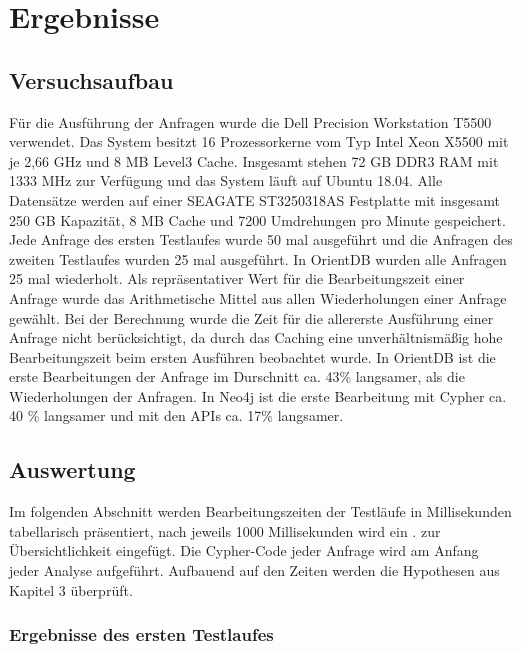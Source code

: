 
\chapter{Ergebnisse} %

\label{Kaptiel4} %

\section{Versuchsaufbau}
Für die Ausführung der Anfragen wurde die Dell Precision Workstation T5500 verwendet. Das System besitzt 16 Prozessorkerne vom Typ Intel Xeon  X5500 mit je 2,66 GHz und  8 MB Level3 Cache. Insgesamt stehen 72 GB DDR3 RAM mit 1333 MHz zur Verfügung und das System läuft auf Ubuntu 18.04. Alle Datensätze werden auf einer SEAGATE ST3250318AS Festplatte mit insgesamt 250 GB Kapazität, 8 MB Cache und 7200 Umdrehungen pro Minute gespeichert.\newline
 Jede Anfrage des ersten Testlaufes wurde 50 mal ausgeführt und die Anfragen des zweiten Testlaufes wurden 25 mal ausgeführt. In OrientDB wurden alle Anfragen 25 mal wiederholt. Als repräsentativer Wert für die Bearbeitungszeit einer Anfrage  wurde das Arithmetische Mittel aus allen Wiederholungen einer Anfrage gewählt. Bei der Berechnung wurde die Zeit für die allererste Ausführung einer Anfrage nicht berücksichtigt, da durch das Caching eine unverhältnismäßig hohe Bearbeitungszeit beim ersten Ausführen beobachtet wurde. In OrientDB ist die erste Bearbeitungen der Anfrage im Durschnitt ca. 43\% langsamer, als die Wiederholungen  der Anfragen. In Neo4j ist die erste Bearbeitung mit Cypher ca. 40 \% langsamer und mit den APIs ca. 17\% langsamer.  
\section{Auswertung}
Im folgenden Abschnitt werden Bearbeitungszeiten der Testläufe in Millisekunden tabellarisch präsentiert, nach jeweils 1000 Millisekunden wird ein \dq.\dq{} zur Übersichtlichkeit eingefügt. Die Cypher-Code jeder Anfrage wird am Anfang jeder Analyse aufgeführt. Aufbauend auf den Zeiten werden die Hypothesen aus Kapitel 3 überprüft.  
\subsection{Ergebnisse des ersten Testlaufes}
